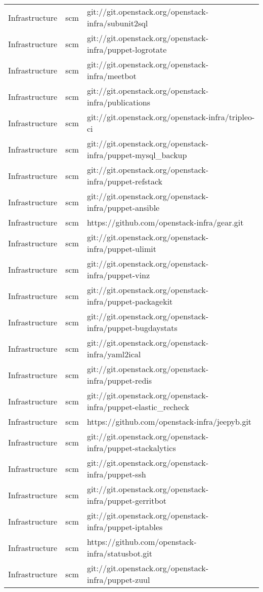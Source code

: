\begin{center}
\begin{longtable}{|p{4cm}|p{1cm}|p{10cm}|}
Infrastructure&scm&git://git.openstack.org/openstack-infra/subunit2sql\\ 
Infrastructure&scm&git://git.openstack.org/openstack-infra/puppet-logrotate\\ 
Infrastructure&scm&git://git.openstack.org/openstack-infra/meetbot\\ 
Infrastructure&scm&git://git.openstack.org/openstack-infra/publications\\ 
Infrastructure&scm&git://git.openstack.org/openstack-infra/tripleo-ci\\ 
Infrastructure&scm&git://git.openstack.org/openstack-infra/puppet-mysql\_backup\\ 
Infrastructure&scm&git://git.openstack.org/openstack-infra/puppet-refstack\\ 
Infrastructure&scm&git://git.openstack.org/openstack-infra/puppet-ansible\\ 
Infrastructure&scm&https://github.com/openstack-infra/gear.git\\ 
Infrastructure&scm&git://git.openstack.org/openstack-infra/puppet-ulimit\\ 
Infrastructure&scm&git://git.openstack.org/openstack-infra/puppet-vinz\\ 
Infrastructure&scm&git://git.openstack.org/openstack-infra/puppet-packagekit\\ 
Infrastructure&scm&git://git.openstack.org/openstack-infra/puppet-bugdaystats\\ 
Infrastructure&scm&git://git.openstack.org/openstack-infra/yaml2ical\\ 
Infrastructure&scm&git://git.openstack.org/openstack-infra/puppet-redis\\ 
Infrastructure&scm&git://git.openstack.org/openstack-infra/puppet-elastic\_recheck\\ 
Infrastructure&scm&https://github.com/openstack-infra/jeepyb.git\\ 
Infrastructure&scm&git://git.openstack.org/openstack-infra/puppet-stackalytics\\ 
Infrastructure&scm&git://git.openstack.org/openstack-infra/puppet-ssh\\ 
Infrastructure&scm&git://git.openstack.org/openstack-infra/puppet-gerritbot\\ 
Infrastructure&scm&git://git.openstack.org/openstack-infra/puppet-iptables\\ 
Infrastructure&scm&https://github.com/openstack-infra/statusbot.git\\ 
Infrastructure&scm&git://git.openstack.org/openstack-infra/puppet-zuul\\ 

\end{longtable}
\end{center}
